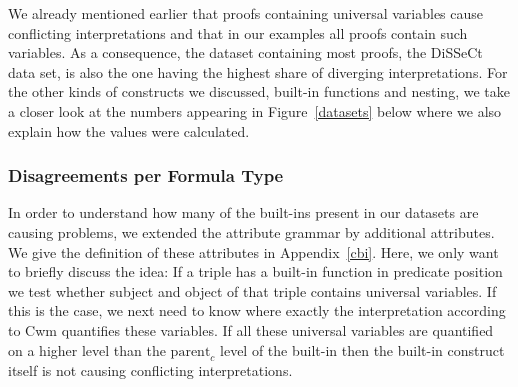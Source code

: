 We already mentioned earlier that proofs containing universal variables cause conflicting interpretations and that in our examples all proofs contain such variables.
As a consequence, the dataset containing most proofs, the DiSSeCt data set, is also the one having the highest share of diverging interpretations.
For the other kinds of constructs we discussed, built-in functions and nesting, we take a closer look at the numbers appearing in 
Figure~\ref{datasets} below where we also explain how the values were calculated. %





\subsubsection*{Disagreements per Formula Type}
In order to understand how many of the built-ins present in our datasets are causing problems, 
we extended the attribute grammar by additional attributes. We give the definition of these attributes in Appendix~\ref{cbi}. Here, 
we only want to briefly discuss the idea: If a triple has a built-in function in predicate position we test whether subject and object of that triple contains universal 
variables.
If this is the case, we next need to know where exactly the interpretation according to Cwm quantifies these variables. If all these universal variables are quantified
on a higher level than the $\text{parent}_c$ level of the built-in then the built-in construct itself is not 
causing conflicting interpretations. 

